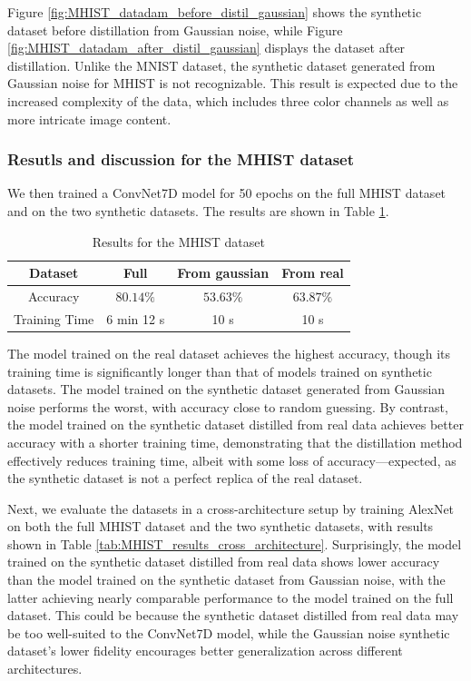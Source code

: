 \documentclass[onecolumn]{IEEEtran}
\begin{document}
Figure \ref{fig:MHIST_datadam_before_distil_gaussian} shows the synthetic dataset before distillation from Gaussian noise, while Figure \ref{fig:MHIST_datadam_after_distil_gaussian} displays the dataset after distillation. Unlike the MNIST dataset, the synthetic dataset generated from Gaussian noise for MHIST is not recognizable. This result is expected due to the increased complexity of the data, which includes three color channels as well as more intricate image content.

\subsubsection{Resutls and discussion for the MHIST dataset}
\label{sec:MHIST_results}
We then trained a ConvNet7D model for 50 epochs on the full MHIST dataset and on the two synthetic datasets. The results are shown in Table \ref{tab:MHIST_results}.

\begin{table}[H]
    \centering
    \begin{tabular}{|c|c|c|c|}
        \hline
        Dataset & Full & From gaussian & From real \\
        \hline
        Accuracy & $80.14\%$ & $53.63\%$ & $63.87\%$ \\
        \hline
        Training Time & 6 min 12 s & 10 s & 10 s \\
        \hline
    \end{tabular}
    \caption{Results for the MHIST dataset}
    \label{tab:MHIST_results}
\end{table}

The model trained on the real dataset achieves the highest accuracy, though its training time is significantly longer than that of models trained on synthetic datasets. The model trained on the synthetic dataset generated from Gaussian noise performs the worst, with accuracy close to random guessing. By contrast, the model trained on the synthetic dataset distilled from real data achieves better accuracy with a shorter training time, demonstrating that the distillation method effectively reduces training time, albeit with some loss of accuracy—expected, as the synthetic dataset is not a perfect replica of the real dataset.

Next, we evaluate the datasets in a cross-architecture setup by training AlexNet on both the full MHIST dataset and the two synthetic datasets, with results shown in Table \ref{tab:MHIST_results_cross_architecture}. Surprisingly, the model trained on the synthetic dataset distilled from real data shows lower accuracy than the model trained on the synthetic dataset from Gaussian noise, with the latter achieving nearly comparable performance to the model trained on the full dataset. This could be because the synthetic dataset distilled from real data may be too well-suited to the ConvNet7D model, while the Gaussian noise synthetic dataset’s lower fidelity encourages better generalization across different architectures.
\end{document}
